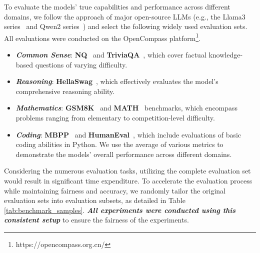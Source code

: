 To evaluate the models' true capabilities and performance across different domains, we follow the approach of major open-source LLMs (e.g., the Llama3 series~\cite{llama3series} and Qwen2 series~\cite{qwen2series}) and select the following widely used evaluation sets. All evaluations were conducted on the OpenCompass platform\footnote{https://opencompass.org.cn/}.

\begin{itemize}
    \item \textbf{\textit{Common Sense}}: \textbf{NQ}~\cite{nq} and \textbf{TriviaQA}~\cite{triviaqa}, which cover factual knowledge-based questions of varying difficulty.
    \item \textbf{\textit{Reasoning}}: \textbf{HellaSwag}~\cite{hellaswag}, which effectively evaluates the model's comprehensive reasoning ability.
    \item \textbf{\textit{Mathematics}}: \textbf{GSM8K}~\cite{gsm8k} and \textbf{MATH}~\cite{math} benchmarks, which encompass problems ranging from elementary to competition-level difficulty.
    \item \textbf{\textit{Coding}}: \textbf{MBPP}~\cite{mbpp} and \textbf{HumanEval}~\cite{humaneval}, which include evaluations of basic coding abilities in Python. We use the average of various metrics to demonstrate the models' overall performance across different domains.
\end{itemize}

Considering the numerous evaluation tasks, utilizing the complete evaluation set would result in significant time expenditure. To accelerate the evaluation process while maintaining fairness and accuracy, we randomly tailor the original evaluation sets into evaluation subsets, as detailed in Table \ref{tab:benchmark_samples}. \textbf{\textit{All experiments were conducted using this consistent setup}} to ensure the fairness of the experiments.
\begin{table}[h]
\centering
\caption{Number of samples in various evaluation benchmarks' datasets.}
\label{tab:benchmark_samples}
\end{table}



